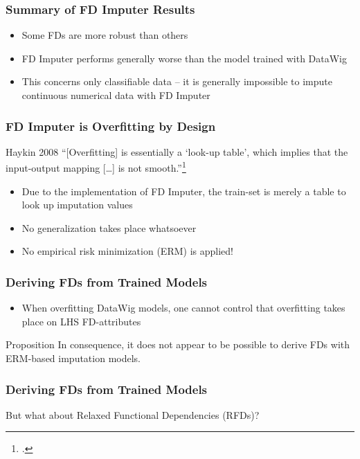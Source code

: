 \documentclass{beamer}
\begin{document}
\begin{frame}
    \frametitle{Summary of FD Imputer Results}
    \begin{itemize}
        \item Some FDs are more robust than others
        \item FD Imputer performs generally worse than the model trained with DataWig
        \item This concerns only classifiable data -- it is generally impossible to impute continuous numerical data with FD Imputer
    \end{itemize}
\end{frame}

\begin{frame}
    \frametitle{FD Imputer is Overfitting by Design}
    \begin{block}{Haykin 2008}
        ``[Overfitting] is essentially a `look-up table', which implies that the input-output mapping [\dots] is not smooth.''\footcite[p.~165]{HAY08}
    \end{block}
    \pause
    \begin{itemize}
        \item Due to the implementation of FD Imputer, the train-set is merely a table to look up imputation values
        \item No generalization takes place whatsoever
        \item No empirical risk minimization (ERM) is applied!
    \end{itemize}
\end{frame}

\begin{frame}
    \frametitle{Deriving FDs from Trained Models}
    \begin{itemize}
        \item When overfitting DataWig models, one cannot control that overfitting takes place on LHS FD-attributes
    \end{itemize}
    \begin{block}{Proposition}
        In consequence, it does not appear to be possible to derive FDs with ERM-based imputation models.
    \end{block}
\end{frame}

\begin{frame}
    \frametitle{Deriving FDs from Trained Models}
    But what about Relaxed Functional Dependencies (RFDs)?
\end{frame}
\end{document}
